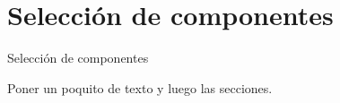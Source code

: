 \section{Selecci\'on de componentes}
\label{Seleccion_componentes}

Selecci\'on de componentes
\par
Poner un poquito de texto y luego las secciones.